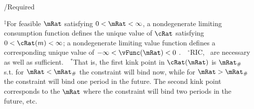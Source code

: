 \documentclass[\econtexRoot/BufferStockTeory]{subfiles}
\let\TableWidth\relax %
\newlength\TableWidth
\begin{document}
\begin{verbatimwrite}{\TableDir/Required}
\begin{table}
\settowidth\TableWidth{\usebox{\Required}}
\usebox{\Required}

\parbox{\TableWidth}{\footnotesize         $^{\ddagger}$For feasible $\mRat$ satisfying $0 < \mRat < \infty$, a nondegenerate limiting consumption function defines the unique value of $\cRat$ satisfying $0 < \cRat(m) < \infty$; a nondegenerate limiting value function defines a corresponding unique value of $-\infty < \vFunc(\mRat) < 0$ .~~$^{\circ}$RIC, \FHWC~are necessary as well as sufficient.~~$^{\ast}$That is, the first kink point in $\cRat(\mRat)$ is $\mRat_{\#}$ s.t. for $\mRat < \mRat_{\#}$ the constraint will bind now, while for $\mRat > \mRat_{\#}$ the constraint will bind one period in the future.  The second kink point corresponds to the $\mRat$ where the constraint will bind two periods in the future, etc.} %
\end{table}
    
\end{verbatimwrite}
\clearpage

\end{document}
